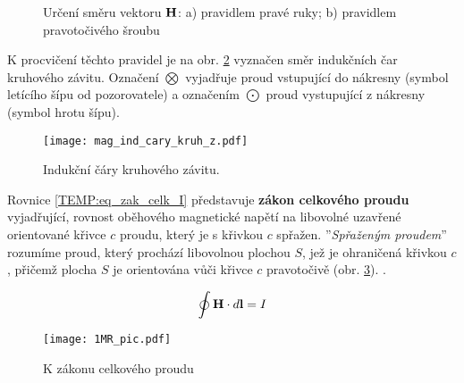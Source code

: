 {         \begin{figure}[ht!]
           \centering
           \hspace{2cm}
           \caption[Pravidlo pravé ruku a pravotočivého šroubu]{Určení směru vektoru $\mathbf{H}$: a)
                   pravidlem pravé ruky; b) pravidlem pravotočivého šroubu}
           \label{temp:fig_urceni_H}
         \end{figure}
    K procvičení těchto pravidel je na obr. \ref{TEMP:fig_ind_c_kruh_z} vyznačen směr indukčních
    čar kruhové\-ho závitu. Označení $\bigotimes$ vyjadřuje proud vstupující  do nákresny (symbol
    letícího šípu od pozorovatele) a označením $\bigodot$ proud vystupující z nákresny (symbol
    hrotu šípu).
    
    \begin{figure}[ht!]
      \centering
      \texttt{[image: mag\_ind\_cary\_kruh\_z.pdf]}
      \caption{Indukční čáry kruhového závitu.}
      \label{TEMP:fig_ind_c_kruh_z}
    \end{figure}    
    Rovnice \ref{TEMP:eq_zak_celk_I} představuje \textbf{zákon celkového proudu} vyjadřující,
    rovnost oběhového magnetické napětí na libovolné uzavřené orientované křivce $c$ proudu, který
    je s křivkou $c$ spřažen. ''\emph{Spřaženým proudem}'' rozumíme proud, který prochází 
    libovolnou plochou $S$, jež je ohraničená křivkou $c$, přičemž plocha $S$ je orientována vůči 
    křivce $c$ pravotočivě (obr. \ref{TEMP:fig_1MR_pic}). \cite[s.~55]{Mayer2001}.

      \begin{equation}\label{TEMP:eq_zak_celk_I}
        \oint\mathbf{H}\cdot d\mathbf{l} = I   
      \end{equation}    
     
      \begin{figure}[ht!]
         \centering
         \texttt{[image: 1MR\_pic.pdf]}
         \caption[Zákon celkového proudu]{K zákonu celkového proudu}
         \label{TEMP:fig_1MR_pic}
      \end{figure}

}
